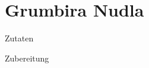 \chapter*{Grumbira Nudla}
\begin{multicols}{2}
 {\Large Zutaten}
 \begin{Zutaten}
		\item 
\end{Zutaten}
\columnbreak
{}
\end{multicols}

{\Large Zubereitung} \newline
\begin{addmargin}[1cm]{0cm}
	
\end{addmargin}
